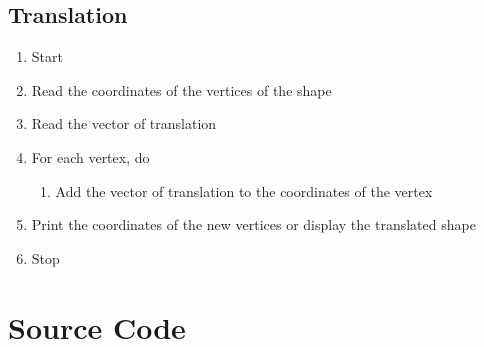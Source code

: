 \documentclass[12pt]{article}
\begin{document}
	\subsection{Translation}
	\begin{enumerate}
		\item Start
		\item Read the coordinates of the vertices of the shape
		\item Read the vector of translation
		\item For each vertex, do
		\begin{enumerate}
			\item Add the vector of translation to the coordinates of the vertex
		\end{enumerate}
		\item Print the coordinates of the new vertices or display the translated shape
		\item Stop
	\end{enumerate}

\newpage
	\section{Source Code}
\end{document}
